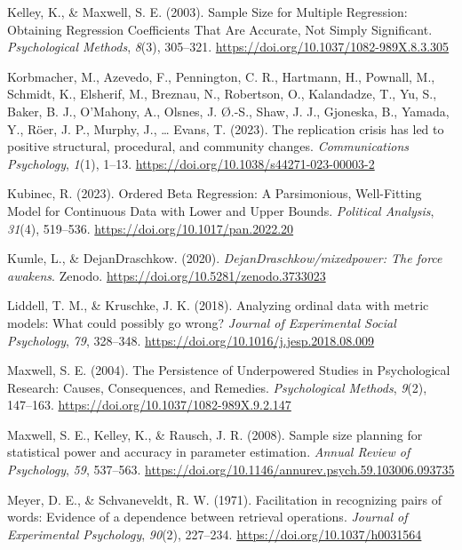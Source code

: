 \documentclass[
  man]{apa7}
\newlength{\cslhangindent}
\newenvironment{CSLReferences}[2] %
 {\begin{list}{}{%
  \setlength{\itemindent}{0pt}
  \setlength{\leftmargin}{0pt}
  \setlength{\parsep}{0pt}
  \ifodd #1
   \setlength{\leftmargin}{\cslhangindent}
   \setlength{\itemindent}{-1\cslhangindent}
  \fi
  \setlength{\itemsep}{#2\baselineskip}}}
 {\end{list}}
\begin{document}
\begin{CSLReferences}{1}{0}
Kelley, K., \& Maxwell, S. E. (2003). Sample Size for Multiple Regression: Obtaining Regression Coefficients That Are Accurate, Not Simply Significant. \emph{Psychological Methods}, \emph{8}(3), 305--321. \url{https://doi.org/10.1037/1082-989X.8.3.305}

Korbmacher, M., Azevedo, F., Pennington, C. R., Hartmann, H., Pownall, M., Schmidt, K., Elsherif, M., Breznau, N., Robertson, O., Kalandadze, T., Yu, S., Baker, B. J., O'Mahony, A., Olsnes, J. Ø.-S., Shaw, J. J., Gjoneska, B., Yamada, Y., Röer, J. P., Murphy, J., \ldots{} Evans, T. (2023). The replication crisis has led to positive structural, procedural, and community changes. \emph{Communications Psychology}, \emph{1}(1), 1--13. \url{https://doi.org/10.1038/s44271-023-00003-2}

Kubinec, R. (2023). Ordered Beta Regression: A Parsimonious, Well-Fitting Model for Continuous Data with Lower and Upper Bounds. \emph{Political Analysis}, \emph{31}(4), 519--536. \url{https://doi.org/10.1017/pan.2022.20}

Kumle, L., \& DejanDraschkow. (2020). \emph{DejanDraschkow/mixedpower: The force awakens}. Zenodo. \url{https://doi.org/10.5281/zenodo.3733023}

Liddell, T. M., \& Kruschke, J. K. (2018). Analyzing ordinal data with metric models: What could possibly go wrong? \emph{Journal of Experimental Social Psychology}, \emph{79}, 328--348. \url{https://doi.org/10.1016/j.jesp.2018.08.009}

Maxwell, S. E. (2004). The Persistence of Underpowered Studies in Psychological Research: Causes, Consequences, and Remedies. \emph{Psychological Methods}, \emph{9}(2), 147--163. \url{https://doi.org/10.1037/1082-989X.9.2.147}

Maxwell, S. E., Kelley, K., \& Rausch, J. R. (2008). Sample size planning for statistical power and accuracy in parameter estimation. \emph{Annual Review of Psychology}, \emph{59}, 537--563. \url{https://doi.org/10.1146/annurev.psych.59.103006.093735}

Meyer, D. E., \& Schvaneveldt, R. W. (1971). Facilitation in recognizing pairs of words: Evidence of a dependence between retrieval operations. \emph{Journal of Experimental Psychology}, \emph{90}(2), 227--234. \url{https://doi.org/10.1037/h0031564}


\end{CSLReferences}
\end{document}
